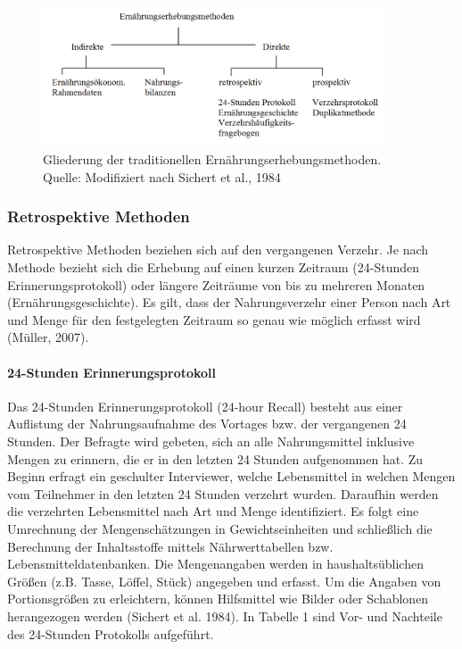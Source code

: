 \begin{figure}[!h]
	\centering
		
	\includegraphics[width=0.9\textwidth]{Bilder/Abb1.png}

	\caption[Gliederung der traditionellen Ernährungserhebungsmethoden]{Gliederung der traditionellen Ernährungserhebungsmethoden.\\ Quelle: Modifiziert nach Sichert et al., 1984}
	\label{bild2}
\end{figure}

\subsubsection{Retrospektive Methoden}

Retrospektive Methoden beziehen sich auf den vergangenen Verzehr. Je nach Methode bezieht sich die Erhebung auf einen kurzen Zeitraum (24-Stunden Erinnerungsprotokoll) oder längere Zeiträume von bis zu mehreren Monaten (Ernährungsgeschichte). Es gilt, dass der Nahrungsverzehr einer Person nach Art und Menge für den festgelegten Zeitraum so genau wie möglich erfasst wird (Müller, 2007).

\paragraph{24-Stunden Erinnerungsprotokoll}

Das 24-Stunden Erinnerungsprotokoll (24-hour Recall) besteht aus einer Auflistung der Nahrungsaufnahme des Vortages bzw. der vergangenen 24 Stunden. Der Befragte wird gebeten, sich an alle Nahrungsmittel inklusive Mengen zu erinnern, die er in den letzten 24 Stunden aufgenommen hat. Zu Beginn erfragt ein geschulter Interviewer, welche Lebensmittel in welchen Mengen vom Teilnehmer in den letzten 24 Stunden verzehrt wurden. Daraufhin werden die verzehrten Lebensmittel nach Art und Menge identifiziert. Es folgt eine Umrechnung der Mengenschätzungen in Gewichtseinheiten und schließlich die Berechnung der Inhaltsstoffe mittels Nährwerttabellen bzw. Lebensmitteldatenbanken. Die Mengenangaben werden in haushaltsüblichen Größen (z.B. Tasse, Löffel, Stück) angegeben und erfasst. Um die Angaben von Portionsgrößen zu erleichtern, können Hilfsmittel wie Bilder oder Schablonen herangezogen werden (Sichert et al. 1984). In Tabelle 1 sind Vor- und Nachteile des 24-Stunden Protokolls aufgeführt.


